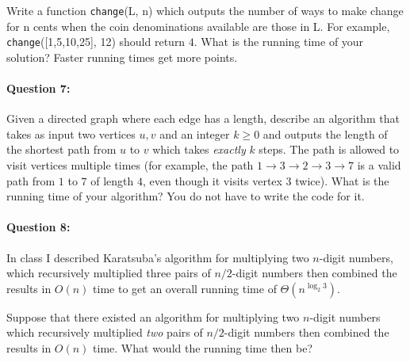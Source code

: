 \documentclass[11pt]{article}
\begin{document}
Write a function \texttt{change}(L, n) which outputs the number of
ways to make change for n cents when the coin denominations available
are those in L.  For example, \texttt{change}([1,5,10,25], 12) should
return $4$.  What is the running time of your solution?  Faster
running times get more points.

\paragraph{Question 7:}  Given a directed graph where each edge has a
length, describe an algorithm that takes as input two vertices $u,v$
and an integer $k\ge 0$ and outputs the length of the shortest path
from $u$ to $v$ which takes {\em exactly} $k$ steps.  The path is
allowed to visit vertices multiple times (for example, the path
$1\rightarrow 3\rightarrow 2\rightarrow 3\rightarrow 7$ is a valid
path from $1$ to $7$ of length $4$, even though it visits vertex $3$
twice).  What is the running time of your algorithm?  You do not have
to write the code for it.

\paragraph{Question 8:}
In class I described Karatsuba's algorithm for multiplying two
$n$-digit numbers, which recursively multiplied three pairs of
$n/2$-digit
numbers then combined the results in $O(n)$ time to get an overall
running time of $\Theta(n^{\log_2 3})$.

Suppose that there existed an algorithm for multiplying two $n$-digit
numbers which recursively multiplied {\em two} pairs of $n/2$-digit
numbers
then combined the results in $O(n)$ time. What would the running time
then be?
\end{document}
